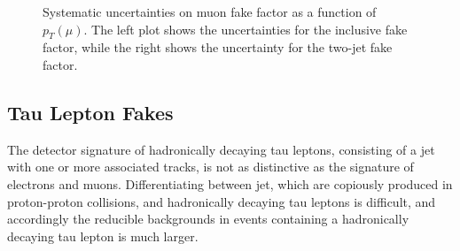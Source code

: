 \begin{figure}
  \centering
  \caption{Systematic uncertainties on muon fake factor as a function of $p_{T}(\mu)$.  The left plot shows the uncertainties for the inclusive fake factor, while the right shows the uncertainty for the two-jet fake factor.}
  \label{fig:MuFake_syst}
\end{figure}



\subsection{Tau Lepton Fakes}\label{sec:ff-tau}
The detector signature of hadronically decaying tau leptons, consisting of a jet with one or more associated tracks, is not as distinctive as the signature of electrons and muons. Differentiating between jet, which are copiously produced in proton-proton collisions, and hadronically decaying tau leptons is difficult, and accordingly the reducible backgrounds in events containing a hadronically decaying tau lepton is much larger. 

